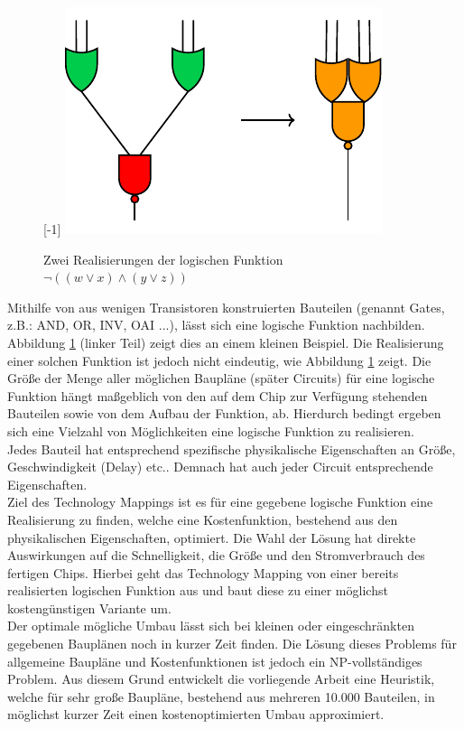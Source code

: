 \documentclass[11pt, a4paper, german]{article}
\newcommand{\TM}{Technology  Mapping }
\begin{document}
\begin{figure}
	\scalebox{1}[-1]{
		\includegraphics[]{pictures/compiled/einfBsp}
	}
		\caption{Zwei Realisierungen der logischen Funktion $\neg((w\lor x) \land (y \lor z))$}
		\label{bild:einfbsp}
\end{figure}
Mithilfe von aus wenigen Transistoren konstruierten Bauteilen (genannt Gates, z.B.: AND, OR, INV, OAI ...), lässt sich eine logische Funktion nachbilden. Abbildung \ref{bild:einfbsp} (linker Teil) zeigt dies an einem kleinen Beispiel.  Die Realisierung einer solchen Funktion ist jedoch nicht eindeutig, wie Abbildung \ref{bild:einfbsp}  zeigt. 
Die Größe der Menge aller möglichen Baupläne (später Circuits) für eine logische Funktion hängt maßgeblich von den auf dem Chip zur Verfügung stehenden Bauteilen sowie von dem Aufbau der Funktion, ab. Hierdurch bedingt ergeben sich eine Vielzahl von  Möglichkeiten eine logische Funktion zu realisieren.\\
 Jedes Bauteil hat entsprechend spezifische physikalische Eigenschaften an Größe, Geschwindigkeit (Delay) etc.. Demnach hat auch jeder Circuit entsprechende Eigenschaften. \\
Ziel des Technology Mappings ist es für eine gegebene logische Funktion eine Realisierung zu finden, welche eine Kostenfunktion, bestehend aus den physikalischen Eigenschaften, optimiert. Die Wahl der Lösung hat direkte Auswirkungen auf die  Schnelligkeit, die Größe und den Stromverbrauch des fertigen Chips. Hierbei geht das \TM von einer bereits realisierten logischen Funktion aus und baut diese zu einer möglichst kostengünstigen Variante um. \\
Der optimale mögliche Umbau lässt sich bei kleinen oder eingeschränkten gegebenen Bauplänen noch in kurzer Zeit finden. Die Lösung dieses Problems für allgemeine Baupläne und Kostenfunktionen ist jedoch ein NP-vollständiges Problem. Aus diesem Grund entwickelt die vorliegende Arbeit eine Heuristik, welche für sehr große Baupläne, bestehend aus mehreren 10.000 Bauteilen, in möglichst kurzer Zeit einen kostenoptimierten Umbau approximiert.\\
\end{document}

